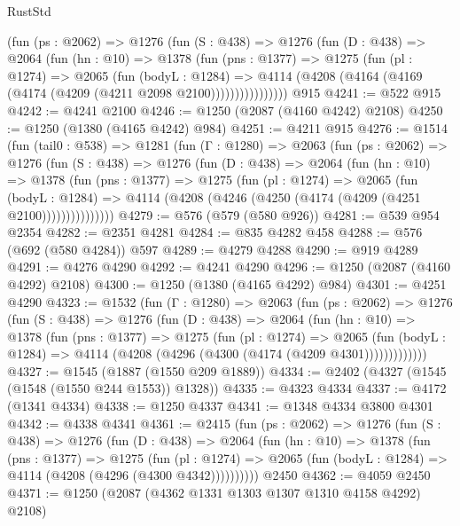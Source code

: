 \begin{lexlean}{RustStd}
\begin{coremodule}
          (fun (ps : @2062) =>
          @1276
            (fun (S : @438) =>
            @1276
              (fun (D : @438) =>
              @2064
                (fun (hn : @10) =>
                @1378
                  (fun (pns : @1377) =>
                  @1275
                    (fun (pl : @1274) =>
                    @2065
                      (fun (bodyL : @1284) =>
                      @4114 (@4208 (@4164 (@4169 (@4174 (@4209 (@4211 @2098 @2100))))))))))))))))
    @915
@4241 := @522 @915
@4242 := @4241 @2100
@4246 := @1250 (@2087 (@4160 @4242) @2108)
@4250 := @1250 (@1380 (@4165 @4242) @984)
@4251 := @4211 @915
@4276 := @1514
    (fun (tail0 : @538) =>
    @1281
      (fun (Γ : @1280) =>
      @2063
        (fun (ps : @2062) =>
        @1276
          (fun (S : @438) =>
          @1276
            (fun (D : @438) =>
            @2064
              (fun (hn : @10) =>
              @1378
                (fun (pns : @1377) =>
                @1275
                  (fun (pl : @1274) =>
                  @2065
                    (fun (bodyL : @1284) =>
                    @4114 (@4208 (@4246 (@4250 (@4174 (@4209 (@4251 @2100)))))))))))))))
@4279 := @576 (@579 (@580 @926))
@4281 := @539 @954 @2354
@4282 := @2351 @4281
@4284 := @835 @4282 @458
@4288 := @576 (@692 (@580 @4284)) @597
@4289 := @4279 @4288
@4290 := @919 @4289
@4291 := @4276 @4290
@4292 := @4241 @4290
@4296 := @1250 (@2087 (@4160 @4292) @2108)
@4300 := @1250 (@1380 (@4165 @4292) @984)
@4301 := @4251 @4290
@4323 := @1532
    (fun (Γ : @1280) =>
    @2063
      (fun (ps : @2062) =>
      @1276
        (fun (S : @438) =>
        @1276
          (fun (D : @438) =>
          @2064
            (fun (hn : @10) =>
            @1378
              (fun (pns : @1377) =>
              @1275
                (fun (pl : @1274) =>
                @2065
                  (fun (bodyL : @1284) =>
                  @4114 (@4208 (@4296 (@4300 (@4174 (@4209 @4301)))))))))))))
@4327 := @1545 (@1887 (@1550 @209 @1889))
@4334 := @2402 (@4327 (@1545 (@1548 (@1550 @244 @1553)) @1328))
@4335 := @4323 @4334
@4337 := @4172 (@1341 @4334)
@4338 := @1250 @4337
@4341 := @1348 @4334 @3800 @4301
@4342 := @4338 @4341
@4361 := @2415
    (fun (ps : @2062) =>
    @1276
      (fun (S : @438) =>
      @1276
        (fun (D : @438) =>
        @2064
          (fun (hn : @10) =>
          @1378
            (fun (pns : @1377) =>
            @1275
              (fun (pl : @1274) =>
              @2065 (fun (bodyL : @1284) => @4114 (@4208 (@4296 (@4300 @4342))))))))))
    @2450
@4362 := @4059 @2450
@4371 := @1250 (@2087 (@4362 @1331 @1303 @1307 @1310 @4158 @4292) @2108)

\end{coremodule}
\end{lexlean}
